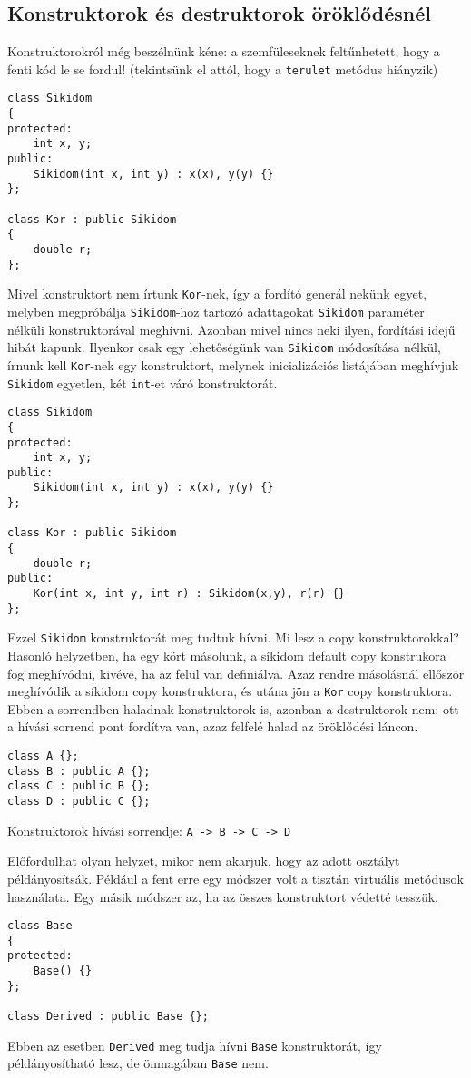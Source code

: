 \documentclass[a4paper,11.5pt,table]{article}
\begin{document}
	\subsection{Konstruktorok és destruktorok öröklődésnél}
	Konstruktorokról még beszélnünk kéne: a szemfüleseknek feltűnhetett, hogy a fenti kód le se fordul! (tekintsünk el attól, hogy a \texttt{terulet} metódus hiányzik)
	\begin{lstlisting}
class Sikidom
{
protected:
	int x, y;
public:
	Sikidom(int x, int y) : x(x), y(y) {}
};

class Kor : public Sikidom
{
	double r;
};
	\end{lstlisting}
	Mivel konstruktort nem írtunk \texttt{Kor}-nek, így a fordító generál nekünk egyet, melyben megpróbálja \texttt{Sikidom}-hoz tartozó adattagokat \texttt{Sikidom} paraméter nélküli konstruktorával meghívni. Azonban mivel nincs neki ilyen, fordítási idejű hibát kapunk. Ilyenkor csak egy lehetőségünk van \texttt{Sikidom} módosítása nélkül, írnunk kell \texttt{Kor}-nek egy konstruktort, melynek inicializációs listájában meghívjuk \texttt{Sikidom} egyetlen, két \texttt{int}-et váró konstruktorát.
\begin{lstlisting}
class Sikidom
{
protected:
	int x, y;
public:
	Sikidom(int x, int y) : x(x), y(y) {}
};

class Kor : public Sikidom
{
	double r;
public:
	Kor(int x, int y, int r) : Sikidom(x,y), r(r) {}
};
\end{lstlisting}
	Ezzel \texttt{Sikidom} konstruktorát meg tudtuk hívni. Mi lesz a copy konstruktorokkal? Hasonló helyzetben, ha egy kört másolunk, a síkidom default copy konstrukora fog meghívódni, kivéve, ha az felül van definiálva. Azaz rendre másolásnál ellőször meghívódik a síkidom copy konstruktora, és utána jön a \texttt{Kor} copy konstruktora. Ebben a sorrendben haladnak konstruktorok is, azonban a destruktorok nem: ott a hívási sorrend pont fordítva van, azaz felfelé halad az öröklődési láncon.
	
	\begin{lstlisting}
class A {};
class B : public A {};
class C : public B {};
class D : public C {};
	\end{lstlisting}
	Konstruktorok hívási sorrendje: \texttt{A -> B -> C -> D}
	
	\medskip
	Előfordulhat olyan helyzet, mikor nem akarjuk, hogy az adott osztályt példányosítsák. Például a fent erre egy módszer volt a tisztán virtuális metódusok használata. Egy másik módszer az, ha az összes konstruktort védetté tesszük.
	\begin{lstlisting}
class Base
{
protected:
	Base() {}
};

class Derived : public Base {};
	\end{lstlisting}
	Ebben az esetben \texttt{Derived} meg tudja hívni \texttt{Base} konstruktorát, így példányosítható lesz, de önmagában \texttt{Base} nem.
	\bigskip
	
\end{document}
